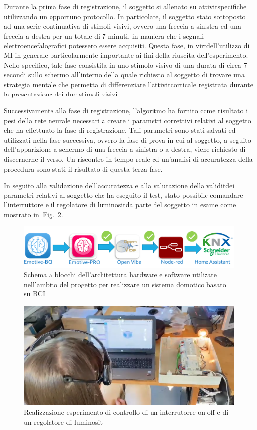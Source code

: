 \documentclass[a4paper]{article}
\newcommand{\fig}{Fig.~}	%
\begin{document}
Durante la prima fase di registrazione, il soggetto si \egrave allenato su attivit\aacuto specifiche utilizzando un opportuno protocollo. In particolare, il soggetto \egrave stato sottoposto ad una serie continuativa di stimoli visivi, ovvero una freccia a sinistra ed una freccia a destra per un totale di 7 minuti, in maniera che i segnali elettroencefalografici potessero essere acquisiti. Questa fase, in virt\uacuto dell'utilizzo di MI \egrave in generale particolarmente importante ai fini della riuscita dell'esperimento. Nello specifico, tale fase \egrave consistita in uno stimolo visivo di una durata di circa 7 secondi sullo schermo all'interno della quale \egrave richiesto al soggetto di trovare una strategia mentale che permetta di differenziare l'attivit\aacuto corticale registrata durante la presentazione dei due stimoli visivi.

Successivamente alla fase di registrazione, l'algoritmo ha fornito come risultato i pesi della rete neurale necessari a creare i parametri correttivi relativi al soggetto che ha effettuato la fase di registrazione. Tali parametri sono stati salvati ed utilizzati nella fase successiva, ovvero la fase di prova in cui al soggetto, a seguito dell'apparizione a schermo di una freccia a sinistra o a destra, viene richiesto di discernerne il verso. Un riscontro in tempo reale ed un'analisi di accuratezza della procedura sono stati il risultato di questa terza fase. 

In seguito alla validazione dell'accuratezza e alla valutazione della validit\aacuto dei parametri relativi al soggetto che ha eseguito il test, \egrave stato possibile comandare l'interruttore e il regolatore di luminosit\aacuto da parte del soggetto in esame come mostrato in~\fig\ref{fig:exp}. 

\begin{figure}[t]
	\includegraphics[width=\textwidth]{block-scheme.png}
	\caption{Schema a blocchi dell'architettura hardware e software utilizate nell'ambito del progetto per realizzare un sistema domotico basato su BCI}
	\label{fig:scheme}
\end{figure}

\begin{figure}[t]
	\includegraphics[width=\textwidth]{real-exp.png}
	\caption{Realizzazione esperimento di controllo di un interrutorre on-off e di un regolatore di luminosit\aacuto}
	\label{fig:exp}
\end{figure}




	
\end{document}
